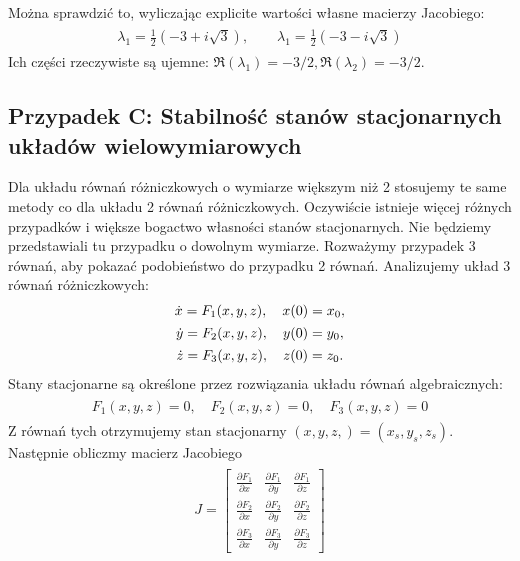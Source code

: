 \documentclass[a4paper,12pt,polish]{sphinxmanual}
\begin{document}
Można sprawdzić to, wyliczając explicite wartości własne macierzy Jacobiego:
\label{ch1/chI023:equation-eqn51}\begin{gather}
\begin{split}\lambda_1 = \frac{1}{2} (-3+i \sqrt 3), \quad \quad \lambda_1 = \frac{1}{2} (-3-i \sqrt 3)\end{split}\label{ch1/chI023-eqn51}
\end{gather}
Ich części rzeczywiste są ujemne:  $\Re(\lambda_1) = -3/2,  \Re(\lambda_2) = -3/2$.


\subsection{Przypadek C: Stabilność stanów stacjonarnych układów wielowymiarowych}
\label{ch1/chI023:przypadek-c-stabilnosc-stanow-stacjonarnych-ukladow-wielowymiarowych}
Dla układu równań różniczkowych o wymiarze większym niż 2 stosujemy te same metody co dla układu 2 równań różniczkowych.  Oczywiście istnieje więcej różnych przypadków i większe bogactwo własności  stanów stacjonarnych.  Nie będziemy przedstawiali tu przypadku o dowolnym wymiarze. Rozważymy przypadek 3 równań, aby pokazać podobieństwo do przypadku 2 równań. Analizujemy układ 3 równań różniczkowych:
\label{ch1/chI023:equation-eqn52}\begin{gather}
\begin{split}\dot x = F_1(x, y, z), \quad x(0) = x_0,\end{split}\label{ch1/chI023-eqn52}\\\begin{split}\dot y = F_2(x, y, z),  \quad y(0) = y_0,\end{split}\notag\\\begin{split}\dot z = F_3(x, y, z),  \quad z(0) = z_0.\end{split}\notag
\end{gather}
Stany stacjonarne są określone przez rozwiązania układu równań algebraicznych:
\label{ch1/chI023:equation-eqn53}\begin{gather}
\begin{split}F_1(x, y, z) = 0, \quad  F_2(x, y, z) = 0,  \quad  F_3(x, y, z)=0\end{split}\label{ch1/chI023-eqn53}
\end{gather}
Z równań tych otrzymujemy  stan stacjonarny   $(x, y, z,) = (x_{s}, y_{s}, z_s)$. Następnie obliczmy macierz Jacobiego
\label{ch1/chI023:equation-eqn54}\begin{gather}
\begin{split} J = \begin{bmatrix}\frac{ \partial F_1}{\partial x}& \frac{\partial F_1}{\partial y}&\frac{ \partial F_1}{\partial z}\\ \frac{ \partial F_2}{\partial x}&  \frac{ \partial F_2}{\partial y} &\frac{ \partial F_2}{\partial z} \\ \frac{ \partial F_3}{\partial x}& \frac{ \partial F_3}{\partial y}&\frac{ \partial F_3}{\partial z} \end{bmatrix}\end{split}\label{ch1/chI023-eqn54}
\end{gather}
\end{document}
